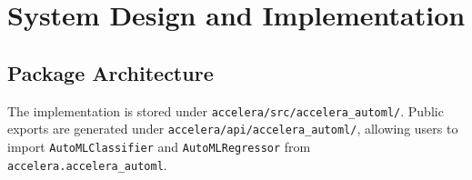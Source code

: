 \documentclass[12pt,a4paper,oneside]{report}
\newcommand{\modulepath}[1]{\texttt{\footnotesize #1}}
\begin{document}
\chapter{System Design and Implementation}
\label{chap:implementation}

\section{Package Architecture}

The implementation is stored under
\modulepath{accelera/src/accelera\_automl/}. Public exports are generated under
\modulepath{accelera/api/accelera\_automl/}, allowing users to import
\texttt{AutoMLClassifier} and \texttt{AutoMLRegressor} from
\modulepath{accelera.accelera\_automl}.
\end{document}
